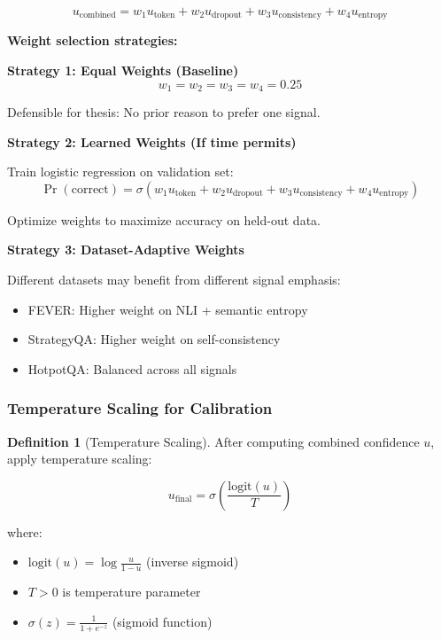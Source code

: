 \documentclass[12pt,a4paper]{article}
\theoremstyle{definition}
\newtheorem{definition}[theorem]{Definition}
\begin{document}
\begin{equation}
u_{\text{combined}} = w_1 u_{\text{token}} + w_2 u_{\text{dropout}} + w_3 u_{\text{consistency}} + w_4 u_{\text{entropy}}
\end{equation}

\textbf{Weight selection strategies:}

\textbf{Strategy 1: Equal Weights (Baseline)}
\begin{equation}
w_1 = w_2 = w_3 = w_4 = 0.25
\end{equation}

Defensible for thesis: No prior reason to prefer one signal.

\textbf{Strategy 2: Learned Weights (If time permits)}

Train logistic regression on validation set:
\begin{equation}
\Pr(\text{correct}) = \sigma(w_1 u_{\text{token}} + w_2 u_{\text{dropout}} + w_3 u_{\text{consistency}} + w_4 u_{\text{entropy}})
\end{equation}

Optimize weights to maximize accuracy on held-out data.

\textbf{Strategy 3: Dataset-Adaptive Weights}

Different datasets may benefit from different signal emphasis:
\begin{itemize}
    \item FEVER: Higher weight on NLI + semantic entropy
    \item StrategyQA: Higher weight on self-consistency
    \item HotpotQA: Balanced across all signals
\end{itemize}

\subsubsection{Temperature Scaling for Calibration}

\begin{definition}[Temperature Scaling]
After computing combined confidence $u$, apply temperature scaling:

\begin{equation}
u_{\text{final}} = \sigma\left(\frac{\text{logit}(u)}{T}\right)
\end{equation}

where:
\begin{itemize}
    \item $\text{logit}(u) = \log\frac{u}{1-u}$ (inverse sigmoid)
    \item $T > 0$ is temperature parameter
    \item $\sigma(z) = \frac{1}{1+e^{-z}}$ (sigmoid function)
\end{itemize}
\end{definition}
\end{document}
